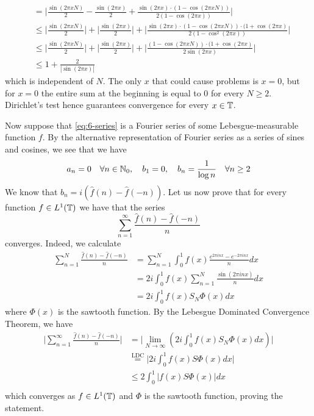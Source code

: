 \documentclass[a4paper, 12pt]{article}
\begin{document}
\begin{Exercise}
\begin{align*}
        &= \Big| \frac{\sin(2\pi x N)}{2} - \frac{\sin(2\pi x)}{2} + \frac{\sin(2\pi x) \cdot (1 - \cos(2\pi xN))}{2(1 - \cos(2\pi x))} \Big| \\
        &\leq \Big| \frac{\sin(2\pi x N)}{2} \Big| + \Big| \frac{\sin(2\pi x)}{2} \Big| + \Big| \frac{\sin(2\pi x) \cdot (1 - \cos(2\pi xN)) \cdot (1 + \cos(2\pi x)}{2(1 - \cos^2(2\pi x))} \Big| \\
        &\leq \Big| \frac{\sin(2\pi x N)}{2} \Big| + \Big| \frac{\sin(2\pi x)}{2} \Big| + \Big| \frac{(1 - \cos(2\pi xN)) \cdot (1 + \cos(2\pi x)}{2\sin(2\pi x)} \Big| \\
        &\leq 1 + \frac{2}{|\sin(2\pi x)|}
    \end{align*}
    which is independent of $N$.
    The only $x$ that could cause problems is $x = 0$, but for $x = 0$ the
    entire sum at the beginning is equal to $0$ for every $N \geq 2$.
    Dirichlet's test hence guarantees convergence for every $x \in \mathbb{T}$.

    Now suppose that \eqref{eq:6-series} is a Fourier series of some Lebesgue-measurable function $f$.
    By the alternative representation of Fourier series as a series of sines and cosines,
    we see that we have
    \[
        a_n = 0 \quad \forall n \in \mathbb{N}_0, \quad b_1 = 0, \quad b_n = \frac{1}{\log n} \quad \forall n \geq 2
    \]
    We know that $b_n = i(\hat{f}(n) - \hat{f}(-n))$.
    Let us now prove that for every function $f \in L^1(\mathbb{T})$ we have that the series
    \[
        \sum_{n = 1}^{\infty} \frac{\hat{f}(n) - \hat{f}(-n)}{n}
    \]
    converges.
    Indeed, we calculate
    \begin{align*}
        \sum_{n = 1}^{N} \frac{\hat{f}(n) - \hat{f}(-n)}{n}
        &= \sum_{n = 1}^{N} \int_{0}^{1} f(x) \frac{e^{2\pi inx} - e^{-2\pi inx}}{n} dx \\
        &= 2i \int_{0}^{1} f(x) \sum_{n = 1}^{N} \frac{\sin(2\pi inx)}{n} dx \\
        &= 2i \int_{0}^{1} f(x) S_N\Phi(x) dx
    \end{align*}
    where $\Phi(x)$ is the sawtooth function.
    By the Lebesgue Dominated Convergence Theorem, we have
    \begin{align*}
        \Big| \sum_{n = 1}^{\infty} \frac{\hat{f}(n) - \hat{f}(-n)}{n} \Big|
        &= \Big| \lim_{N \to \infty} (2i \int_{0}^{1} f(x) S_N\Phi(x) dx) \Big| \\
        &\overset{\text{LDC}}{=} \Big| 2i \int_{0}^{1} f(x) S\Phi(x) dx \Big| \\
        &\leq 2 \int_{0}^{1} | f(x) S\Phi(x) | dx \\
    \end{align*}
    which converges as $f \in L^1(\mathbb{T})$ and $\Phi$ is the sawtooth function, proving the statement.


\end{Exercise}
\end{document}
